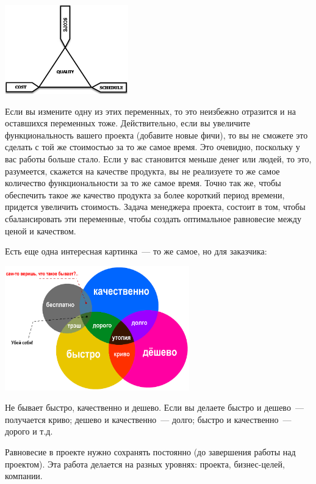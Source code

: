 \documentclass{../../text-style}
\begin{document}
\begin{center}
    \includegraphics[width=0.4\textwidth]{balanceTriangle.png}
\end{center}

Если вы измените одну из этих переменных, то это неизбежно отразится и на оставшихся переменных тоже. Действительно, если вы увеличите функциональность вашего проекта (добавите новые фичи), то вы не сможете это сделать с той же стоимостью за то же самое время. Это очевидно, поскольку у вас работы больше стало. Если у вас становится меньше денег или людей, то это, разумеется, скажется на качестве продукта, вы не реализуете то же самое количество функциональности за то же самое время. Точно так же, чтобы обеспечить такое же качество продукта за более короткий период времени, придется увеличить стоимость. Задача менеджера проекта, состоит в том, чтобы сбалансировать эти переменные, чтобы создать оптимальное равновесие между ценой и качеством.

Есть еще одна интересная картинка~--- то же самое, но для заказчика:

\begin{center}
    \includegraphics[width=0.6\textwidth]{balanceTriangleExplained.png}
\end{center}

Не бывает быстро, качественно и дешево. Если вы делаете быстро и дешево~--- получается криво; дешево и качественно~--- долго; быстро и качественно~--- дорого и т.д.

Равновесие в проекте нужно сохранять постоянно (до завершения работы над проектом). Эта работа делается на разных уровнях: проекта, бизнес-целей, компании.
\end{document}
